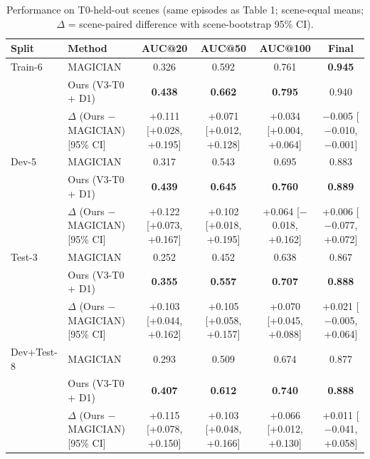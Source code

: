 \begin{table}[t]
\centering
\small
\begin{tabular}{llcccc}
\toprule
Split & Method & AUC@20 & AUC@50 & AUC@100 & Final \\
\midrule
Train-6 & MAGICIAN & 0.326 & 0.592 & 0.761 & \textbf{0.945} \\
 & Ours (V3-T0 + D1) & \textbf{0.438} & \textbf{0.662} & \textbf{0.795} & 0.940 \\
 & $\Delta$ (Ours $-$ MAGICIAN) [95\% CI] & +0.111 [+0.028, +0.195] & +0.071 [+0.012, +0.128] & +0.034 [+0.004, +0.064] & $-$0.005 [$-$0.010, $-$0.001] \\
\midrule
Dev-5 & MAGICIAN & 0.317 & 0.543 & 0.695 & 0.883 \\
 & Ours (V3-T0 + D1) & \textbf{0.439} & \textbf{0.645} & \textbf{0.760} & \textbf{0.889} \\
 & $\Delta$ (Ours $-$ MAGICIAN) [95\% CI] & +0.122 [+0.073, +0.167] & +0.102 [+0.018, +0.195] & +0.064 [$-$0.018, +0.162] & +0.006 [$-$0.077, +0.072] \\
\midrule
Test-3 & MAGICIAN & 0.252 & 0.452 & 0.638 & 0.867 \\
 & Ours (V3-T0 + D1) & \textbf{0.355} & \textbf{0.557} & \textbf{0.707} & \textbf{0.888} \\
 & $\Delta$ (Ours $-$ MAGICIAN) [95\% CI] & +0.103 [+0.044, +0.162] & +0.105 [+0.058, +0.157] & +0.070 [+0.045, +0.088] & +0.021 [$-$0.005, +0.064] \\
\midrule
Dev+Test-8 & MAGICIAN & 0.293 & 0.509 & 0.674 & 0.877 \\
 & Ours (V3-T0 + D1) & \textbf{0.407} & \textbf{0.612} & \textbf{0.740} & \textbf{0.888} \\
 & $\Delta$ (Ours $-$ MAGICIAN) [95\% CI] & +0.115 [+0.078, +0.150] & +0.103 [+0.048, +0.166] & +0.066 [+0.012, +0.130] & +0.011 [$-$0.041, +0.058] \\
\bottomrule
\end{tabular}
\caption{Performance on T0-held-out scenes (same episodes as Table 1; scene-equal means; $\Delta$ = scene-paired difference with scene-bootstrap 95\% CI).}
\label{tab:splits}
\end{table}
